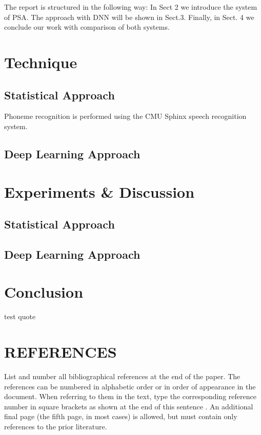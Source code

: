 \documentclass{article}
\begin{document}
The report is structured in the following way: In Sect 2 we introduce the system of PSA. The approach with DNN will be shown in Sect.3. Finally, in Sect. 4 we conclude our work with comparison of both systems. 


\section{Technique}
\label{sec:technique}

\subsection{Statistical Approach}

Phoneme recognition is performed using the CMU Sphinx \cite{lamere2003cmu} speech recognition system.   \cite{kepuska2017comparing}

\subsection{Deep Learning Approach}

\section{Experiments \& Discussion}
\label{sec:experiments}

\subsection{Statistical Approach}

\subsection{Deep Learning Approach}

\section{Conclusion}
\label{sec:conclusion}

test quote \cite{matejka2005phonotactic}


\section{REFERENCES}
\label{sec:refs}

List and number all bibliographical references at the end of the
paper. The references can be numbered in alphabetic order or in
order of appearance in the document. When referring to them in
the text, type the corresponding reference number in square
brackets as shown at the end of this sentence \cite{C2}. An
additional final page (the fifth page, in most cases) is
allowed, but must contain only references to the prior
literature.



\end{document}
